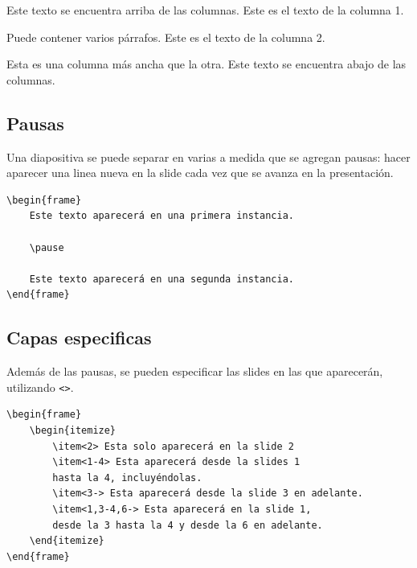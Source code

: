 \documentclass[../notes.tex]{subfiles}
\begin{document}
    Este texto se encuentra arriba de las columnas.
    \vspace{1em}
        Este es el texto de la columna 1.
            
        Puede contener varios párrafos.
        Este es el texto de la columna 2.
            
        Esta es una columna más ancha que la otra.
    \vspace{1em}
    Este texto se encuentra abajo de las columnas.

    \subsection{Pausas}
    
    	Una diapositiva se puede separar en varias a medida que se agregan pausas: hacer aparecer una linea nueva en la slide cada vez que se avanza en la presentación.
        \begin{verbatim}
\begin{frame}
    Este texto aparecerá en una primera instancia.
    
    \pause
    
    Este texto aparecerá en una segunda instancia.
\end{frame}
        \end{verbatim}

    \subsection{Capas especificas}
    
    	Además de las pausas, se pueden especificar las slides en las que aparecerán, utilizando \texttt{<>}.
        \begin{verbatim}
\begin{frame}
    \begin{itemize}
        \item<2> Esta solo aparecerá en la slide 2
        \item<1-4> Esta aparecerá desde la slides 1 
        hasta la 4, incluyéndolas.
        \item<3-> Esta aparecerá desde la slide 3 en adelante.
        \item<1,3-4,6-> Esta aparecerá en la slide 1, 
        desde la 3 hasta la 4 y desde la 6 en adelante.
    \end{itemize}
\end{frame}
        \end{verbatim}
    
\end{document}
